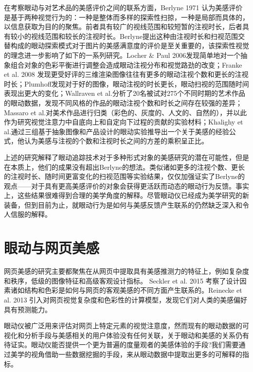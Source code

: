 在考察眼动与对艺术品的美感评价之间的联系方面，Berlyne 1971 认为美感评价是基于两种视觉行为的：一种是整体而多样的探索性扫掠，一种是局部而具体的，以信息获取为目的的聚焦。前者具有较广的视线范围和较短暂的注视时长，后者具有较小的视线范围和较长的注视时长。Berlyne提出这种由注视时长和扫视范围交替构成的眼动探索模式对于图片的美感满意度的评价是至关重要的，该探索性视觉的理念进一步影响了如下的一系列研究。Locher \& Paul 2006发现简单地对一个抽象组合对象的色彩平衡进行调整会造成眼动注视分布和视觉路劲的改变；Franke et al. 2008 发现更受好评的三维渲染图像往往有更多的眼动注视个数和更长的注视时长；Plumhoff发现对于好的图像，眼动注视的时长更长，眼动扫视的范围随时间表现出更大的变化；Wallraven et al.分析了20名被试对275个不同时期的艺术作品的眼动数据，发现不同风格的作品的眼动注视个数和时长之间存在较强的差异；Massaro et al.对美术作品进行归类（彩色的、灰度的、人文的、自然的），并以此作为研究视觉注意力中自底向上和自定向下过程的贡献的实验材料；Khalighy et al.通过三组基于抽象图像和产品设计的眼动实验推导出一个关于美感的经验公式，他认为美感与注视的个数和注视时长之间的方差的乘积呈正比。

上述的研究解释了眼动追踪技术对于多种形式对象的美感研究的潜在可能性，但是在本质上，他们的成果没有超出Berlyne的想法。类似诸如更多的注视个数、更长的注视时长、随时间更富变化的扫视范围等实验结果，仅仅加强证实了Berlyne的观点——对于具有更高美感评价的对象会获得更活跃而动态的眼动行为反馈。事实上，这些结果很难得到合理的美学角度的解释。尽管眼动仪已经成为美学研究的新装备，但到目前为止，就眼动行为是如何与美感反馈产生联系的仍然缺乏深入和令人信服的解释。


\section{眼动与网页美感}
网页美感的研究主要都聚焦在从网页中提取具有美感推测力的特征上，例如复杂度和秩序，低级的图像特征和高级客观设计指标。
Seckler et al. 2015 考察了设计因素诸如结构和色彩是如何与网页的客观美感的不同方面产生联系的。Reinecke et al. 2013 引入对网页视觉复杂度和色彩性的计算模型，发现它们对人类的美感偏好具有预测能力。

眼动仪被广泛用来评估对网页上特定元素的视觉注意度，然而现有的眼动数据的可视化和分析手段与美感相关的用户体验没有任何关联，关于眼动和美感的关系仍有待证实。眼动仪能否提供一个更为普遍的度量观者的美感体验的手段?我们需要通过美学的视角借助一些数据挖掘的手段，来从眼动数据中提取出更多的可解释的指标。


